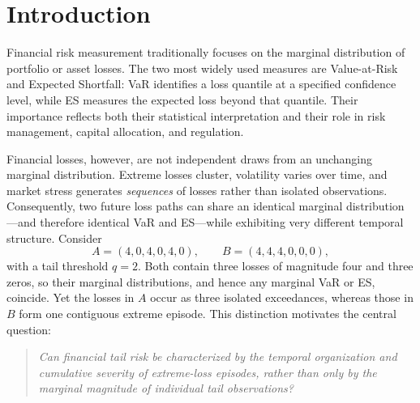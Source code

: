 \documentclass[11pt]{article}
\begin{document}
\begin{abstract}
\medskip
\noindent\textbf{Keywords:} Tail risk; Value-at-Risk; Expected Shortfall; extreme-value theory; clustered
extremes; path-dependent risk; financial risk measurement; Conditional Tail Episode Risk; volatility
clustering.

\noindent\textbf{JEL Classification:} C22; C53; G17; G32.
\end{abstract}

\section{Introduction}\label{sec:intro}

Financial risk measurement traditionally focuses on the marginal distribution of portfolio or asset
losses. The two most widely used measures are Value-at-Risk and Expected Shortfall: VaR identifies a loss
quantile at a specified confidence level, while ES measures the expected loss beyond that quantile. Their
importance reflects both their statistical interpretation and their role in risk management, capital
allocation, and regulation.

Financial losses, however, are not independent draws from an unchanging marginal distribution. Extreme
losses cluster, volatility varies over time, and market stress generates \emph{sequences} of losses rather
than isolated observations. Consequently, two future loss paths can share an identical marginal
distribution---and therefore identical VaR and ES---while exhibiting very different temporal structure.
Consider
\[
A=(4,0,4,0,4,0), \qquad B=(4,4,4,0,0,0),
\]
with a tail threshold $q=2$. Both contain three losses of magnitude four and three zeros, so their marginal
distributions, and hence any marginal VaR or ES, coincide. Yet the losses in $A$ occur as three isolated
exceedances, whereas those in $B$ form one contiguous extreme episode. This distinction motivates the
central question:

\begin{quote}
\emph{Can financial tail risk be characterized by the temporal organization and cumulative severity of
extreme-loss episodes, rather than only by the marginal magnitude of individual tail observations?}
\end{quote}
\end{document}
